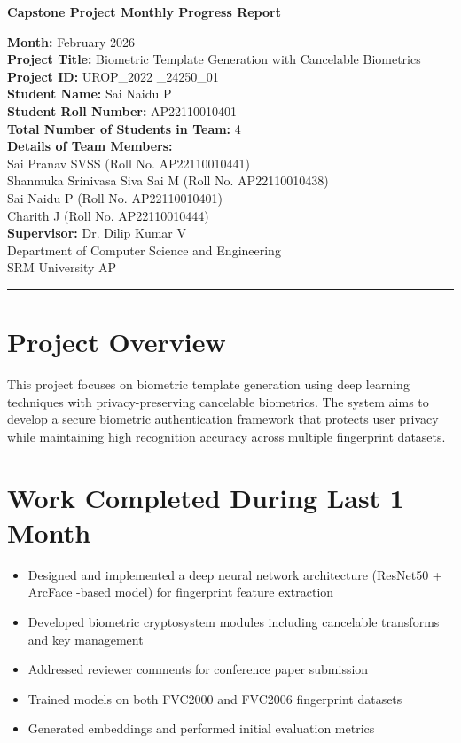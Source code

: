 \documentclass[12pt,a4paper]{article}
\begin{document}
\begin{center}
    \Large \textbf{Capstone Project Monthly Progress Report}\\[0.5cm]
    \normalsize
    
    \textbf{Month:} February 2026 \\[0.5cm]
    \textbf{Project Title:} Biometric Template Generation with Cancelable Biometrics \\[0.5cm]
    \textbf{Project ID:} UROP\_2022 \_24250\_01\\[0.5cm]
    \textbf{Student Name:} Sai Naidu P \\
    \textbf{Student Roll Number:} AP22110010401\\

    \textbf{Total Number of Students in Team:} 4 \\[0.3cm]
    \textbf{Details of Team Members:}\\
    Sai Pranav SVSS  (Roll No. AP22110010441)\\
    Shanmuka Srinivasa Siva Sai M (Roll No. AP22110010438)\\
    Sai Naidu P (Roll No. AP22110010401)\\
    Charith J (Roll No. AP22110010444)\\[0.2cm]
    \textbf{Supervisor:} Dr. Dilip Kumar V \\[0.5cm]
    Department of Computer Science and Engineering\\
    SRM University AP
\end{center}

\hrule
\vspace{1cm}

\section{Project Overview}
This project focuses on biometric template generation using deep learning techniques with privacy-preserving cancelable biometrics. The system aims to develop a secure biometric authentication framework that protects user privacy while maintaining high recognition accuracy across multiple fingerprint datasets.

\section{Work Completed During Last 1 Month}
\begin{itemize}[leftmargin=*]
    \item Designed and implemented a deep neural network architecture (ResNet50 + ArcFace -based model) for fingerprint feature extraction
    \item Developed biometric cryptosystem modules including cancelable transforms and key management
    \item Addressed reviewer comments for conference paper submission
    \item Trained models on both FVC2000 and FVC2006 fingerprint datasets
    \item Generated embeddings and performed initial evaluation metrics
\end{itemize}
\end{document}
